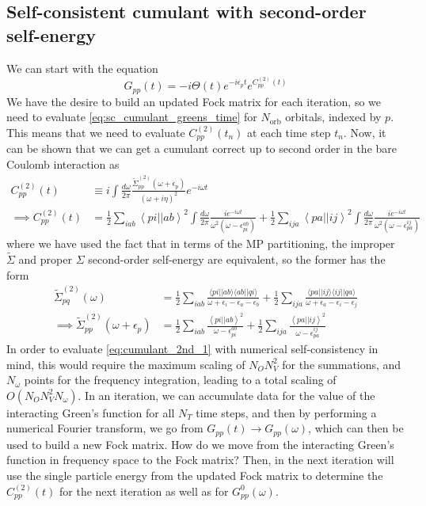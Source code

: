 \subsection{Self-consistent cumulant with second-order self-energy}
We can start with the equation
\begin{equation}
    G_{pp}(t) = -i \Theta(t) e^{-i \epsilon_p t} e^{C_{pp}^{(2)}(t)}
\label{eq:sc_cumulant_greens_time}
\end{equation}
We have the desire to build an updated Fock matrix for each iteration, so we need to evaluate \ref{eq:sc_cumulant_greens_time} for $N_{\text{orb}}$ orbitals, indexed by $p$. This means that we need to evaluate $C_{pp}^{(2)}(t_n)$ at each time step $t_n$. Now, it can be shown that we can get a cumulant correct up to second order in the bare Coulomb interaction as
\begin{align}
C_{pp}^{(2)}(t) &\equiv i \int \frac{d\omega}{2\pi} \frac{ \tilde{\Sigma}_{pp}^{(2)}\left(\omega+\epsilon_p\right)}{(\omega + i \eta)^2} e^{-i \omega t} \\
\implies C_{pp}^{(2)}(t) &= \frac{1}{2} \sum_{iab} \left< pi \left| \right| ab \right>^2 \int \frac{d\omega}{2\pi} \frac{i e^{-i \omega t}}{\omega^2\left(\omega-\epsilon_{pi}^{ab}\right)} + \frac{1}{2} \sum_{ija} \left< pa \left| \right| ij \right>^2 \int \frac{d\omega}{2\pi} \frac{i e^{-i \omega t}}{\omega^2\left(\omega-\epsilon_{pa}^{ij}\right)} 
\label{eq:cumulant_2nd_1}
\end{align}
where we have used the fact that in terms of the MP partitioning, the improper $\tilde{\Sigma}$ and proper $\Sigma$ second-order self-energy are equivalent, so the former has the form
\begin{align}
    \tilde{\Sigma}_{pq}^{(2)}(\omega) &= \frac{1}{2} \sum_{iab} \frac{\langle pi || ab \rangle \langle ab || qi \rangle}{\omega + \epsilon_i - \epsilon_a - \epsilon_b} + \frac{1}{2} \sum_{ija} \frac{\langle pa || ij \rangle \langle ij || qa \rangle}{\omega + \epsilon_a - \epsilon_i - \epsilon_j} \\
\implies \tilde{\Sigma}_{pp}^{(2)}(\omega+\epsilon_p) &= \frac{1}{2} \sum_{iab}
\frac{\left< pi \left| \right| ab \right>^2}
{\omega-\epsilon_{pi}^{ab}} + \frac{1}{2} \sum_{ija}
\frac{\left< pa \left| \right| ij \right>^2}
{\omega-\epsilon_{pa}^{ij}}
\end{align}
In order to evaluate \ref{eq:cumulant_2nd_1} with numerical self-consistency in mind, this would require the maximum scaling of $N_O N_V^2$ for the summations, and $N_\omega$ points for the frequency integration, leading to a total scaling of $O(N_O N_V^2 N_\omega)$. In an iteration, we can accumulate data for the value of the interacting Green's function for all $N_T$ time steps, and then by performing a numerical Fourier transform, we go from $G_{pp}(t)\rightarrow G_{pp}(\omega)$, which can then be used to build a new Fock matrix. How do we move from the interacting Green's function in frequency space to the Fock matrix? Then, in the next iteration will use the single particle energy from the updated Fock matrix to determine the $C_{pp}^{(2)}(t)$ for the next iteration as well as for $G^0_{pp}(\omega)$.
